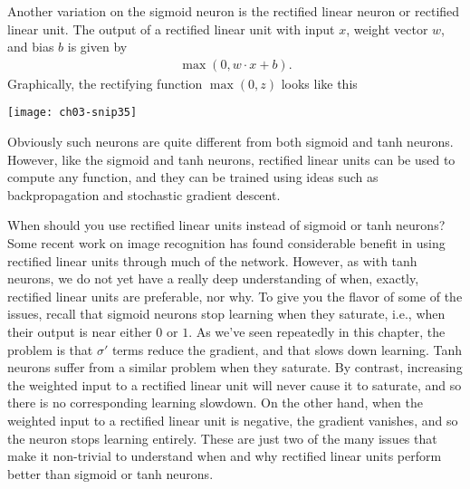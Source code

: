     Another variation on the sigmoid neuron is the rectified linear neuron or rectified linear unit. The output of a rectified linear unit with input $x$, weight vector $w$, and bias $b$ is given by 
\begin{eqnarray} \max(0, w \cdot x+b). 
    \label{eq:c03-112}
\end{eqnarray} 
    Graphically, the rectifying function $\max(0, z)$ looks like this
    \begin{marginfigure}
            \texttt{[image: ch03-snip35]}
            \end{marginfigure}
    Obviously such neurons are quite different from both sigmoid and tanh neurons. However, like the sigmoid and tanh neurons, rectified linear units can be used to compute any function, and they can be trained using ideas such as backpropagation and stochastic gradient descent.

    When should you use rectified linear units instead of sigmoid or tanh neurons? Some recent work on image recognition    
    has found considerable benefit in using rectified linear units through much of the network. However, as with tanh neurons, we do not yet have a really deep understanding of when, exactly, rectified linear units are preferable, nor why. To give you the flavor of some of the issues, recall that sigmoid neurons stop learning when they saturate, i.e., when their output is near either $0$ or $1$. As we've seen repeatedly in this chapter, the problem is that $\sigma'$ terms reduce the gradient, and that slows down learning. Tanh neurons suffer from a similar problem when they saturate. By contrast, increasing the weighted input to a rectified linear unit will never cause it to saturate, and so there is no corresponding learning slowdown. On the other hand, when the weighted input to a rectified linear unit is negative, the gradient vanishes, and so the neuron stops learning entirely. These are just two of the many issues that make it non-trivial to understand when and why rectified linear units perform better than sigmoid or tanh neurons.
    
